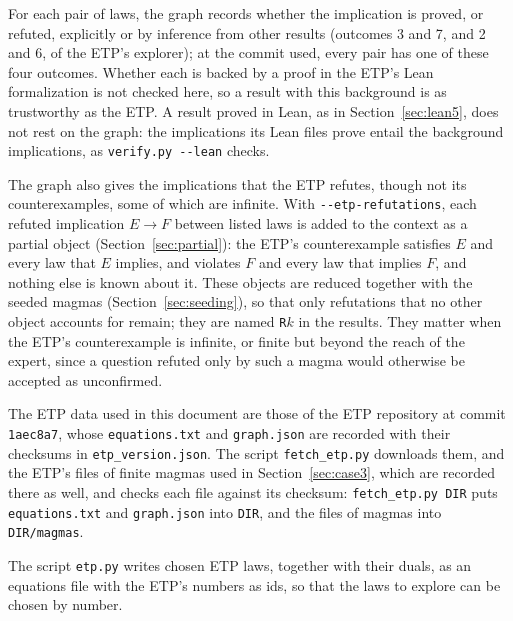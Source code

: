 \documentclass[11pt,a4paper]{article}
\theoremstyle{definition}
\theoremstyle{remark}
\newcommand{\code}[1]{\texttt{#1}}
\begin{document}
For each pair of laws, the graph records whether the implication is proved, or refuted, explicitly or by inference from other results (outcomes 3 and 7, and 2 and 6, of the ETP's explorer); at the commit used, every pair has one of these four outcomes. Whether each is backed by a proof in the ETP's Lean formalization is not checked here, so a result with this background is as trustworthy as the ETP. A result proved in Lean, as in Section~\ref{sec:lean5}, does not rest on the graph: the implications its Lean files prove entail the background implications, as \code{verify.py -{}-lean} checks.

The graph also gives the implications that the ETP refutes, though not its counterexamples, some of which are infinite. With \code{-{}-etp-refutations}, each refuted implication $E \to F$ between listed laws is added to the context as a partial object (Section~\ref{sec:partial}): the ETP's counterexample satisfies $E$ and every law that $E$ implies, and violates $F$ and every law that implies $F$, and nothing else is known about it. These objects are reduced together with the seeded magmas (Section~\ref{sec:seeding}), so that only refutations that no other object accounts for remain; they are named \code{R}$k$ in the results. They matter when the ETP's counterexample is infinite, or finite but beyond the reach of the expert, since a question refuted only by such a magma would otherwise be accepted as unconfirmed.

The ETP data used in this document are those of the ETP repository at commit \code{1aec8a7}, whose \code{equations.txt} and \code{graph.json} are recorded with their checksums in \code{etp\_version.json}. The script \code{fetch\_etp.py} downloads them, and the ETP's files of finite magmas used in Section~\ref{sec:case3}, which are recorded there as well, and checks each file against its checksum: \code{fetch\_etp.py DIR} puts \code{equations.txt} and \code{graph.json} into \code{DIR}, and the files of magmas into \code{DIR/magmas}.

The script \code{etp.py} writes chosen ETP laws, together with their duals, as an equations file with the ETP's numbers as ids, so that the laws to explore can be chosen by number.
\end{document}
